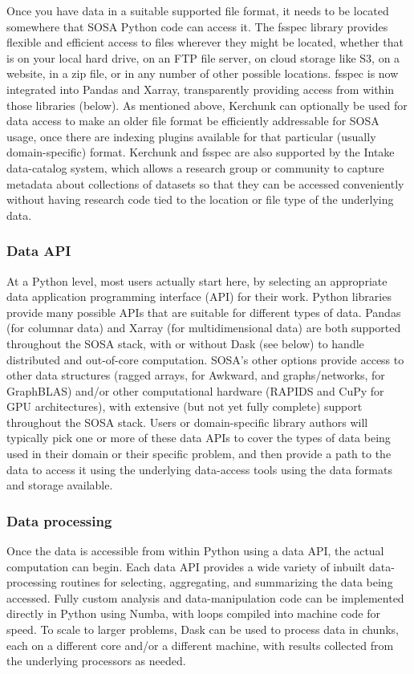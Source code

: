 Once you have data in a suitable supported file format, it needs to be located somewhere that SOSA Python code can access it. The fsspec library provides flexible and efficient access to files wherever they might be located, whether that is on your local hard drive, on an FTP file server, on cloud storage like S3, on a website, in a zip file, or in any number of other possible locations. fsspec is now integrated into Pandas and Xarray, transparently providing access from within those libraries (below). As mentioned above, Kerchunk can optionally be used for data access to make an older file format be efficiently addressable for SOSA usage, once there are indexing plugins available for that particular (usually domain-specific) format. Kerchunk and fsspec are also supported by the Intake data-catalog system, which allows a research group or community to capture metadata about collections of datasets so that they can be accessed conveniently without having research code tied to the location or file type of the underlying data.

\subsubsection{Data API}

At a Python level, most users actually start here, by selecting an appropriate data application programming interface (API) for their work. Python libraries provide many possible APIs that are suitable for different types of data. Pandas (for columnar data) and Xarray (for multidimensional data) are both supported throughout the SOSA stack, with or without Dask (see below) to handle distributed and out-of-core computation. SOSA's other options provide access to other data structures (ragged arrays, for Awkward, and graphs/networks, for GraphBLAS) and/or other computational hardware (RAPIDS and CuPy for GPU architectures), with extensive (but not yet fully complete) support throughout the SOSA stack. Users or domain-specific library authors will typically pick one or more of these data APIs to cover the types of data being used in their domain or their specific problem, and then provide a path to the data to access it using the underlying data-access tools using the data formats and storage available.

\subsubsection{Data processing}

Once the data is accessible from within Python using a data API, the actual computation can begin. Each data API provides a wide variety of inbuilt data-processing routines for selecting, aggregating, and summarizing the data being accessed. Fully custom analysis and data-manipulation code can be implemented directly in Python using Numba, with loops compiled into machine code for speed. To scale to larger problems, Dask can be used to process data in chunks, each on a different core and/or a different machine, with results collected from the underlying processors as needed.

